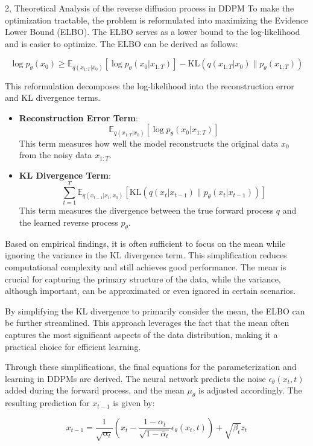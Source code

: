 \documentclass[10pt,a4paper]{article}
\begin{document}
\begin{task}{2,  Theoretical Analysis of the reverse diffusion process in DDPM}
To make the optimization tractable, the problem is reformulated into maximizing the Evidence Lower Bound (ELBO). The ELBO serves as a lower bound to the log-likelihood and is easier to optimize. The ELBO can be derived as follows:

\[
\log p_\theta(x_0) \geq \mathbb{E}_{q(x_{1:T} | x_0)} \left[ \log p_\theta(x_0 | x_{1:T}) \right] - \text{KL}(q(x_{1:T} | x_0) \| p_\theta(x_{1:T}))
\]

This reformulation decomposes the log-likelihood into the reconstruction error and KL divergence terms.

\begin{itemize}
    \item \textbf{Reconstruction Error Term}:
    \[
    \mathbb{E}_{q(x_{1:T} | x_0)} \left[ \log p_\theta(x_0 | x_{1:T}) \right]
    \]
    This term measures how well the model reconstructs the original data \( x_0 \) from the noisy data \( x_{1:T} \).

    \item \textbf{KL Divergence Term}:
    \[
    \sum_{t=1}^T \mathbb{E}_{q(x_{t-1} | x_t, x_0)} \left[ \text{KL}(q(x_t | x_{t-1}) \| p_\theta(x_t | x_{t-1})) \right]
    \]
    This term measures the divergence between the true forward process \( q \) and the learned reverse process \( p_\theta \).
\end{itemize}

Based on empirical findings, it is often sufficient to focus on the mean while ignoring the variance in the KL divergence term. This simplification reduces computational complexity and still achieves good performance. The mean is crucial for capturing the primary structure of the data, while the variance, although important, can be approximated or even ignored in certain scenarios.

By simplifying the KL divergence to primarily consider the mean, the ELBO can be further streamlined. This approach leverages the fact that the mean often captures the most significant aspects of the data distribution, making it a practical choice for efficient learning.

Through these simplifications, the final equations for the parameterization and learning in DDPMs are derived. The neural network predicts the noise \( \epsilon_\theta(x_t, t) \) added during the forward process, and the mean \( \mu_\theta \) is adjusted accordingly. The resulting prediction for \( x_{t-1} \) is given by:

\[
x_{t-1} = \frac{1}{\sqrt{\alpha_t}} \left( x_t - \frac{1 - \alpha_t}{\sqrt{1 - \bar{\alpha}_t}} \epsilon_\theta(x_t, t) \right) + \sqrt{\beta_t} z_t
\]


\end{task}
\end{document}
